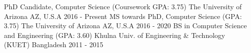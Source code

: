 

\begin{cventries}

  \cventry
    {PhD Candidate, Computer Science (Coursework GPA: 3.75)} %
    {The University of Arizona} %
    {AZ, U.S.A} %
    {2016 - Present} %
    {}
    {}
  \vspace*{-2mm}
  \cventry
    {MS towards PhD, Computer Science (GPA: 3.75)} %
    {The University of Arizona} %
    {AZ, U.S.A} %
    {2016 - 2020} %
    {}
    {}
  \vspace*{-2mm}
  \cventry
    {BS in Computer Science and Engineering (GPA: 3.60)} %
    {Khulna Univ. of Engineering \& Technology (KUET)} %
    {Bangladesh} %
    {2011 - 2015} %
    {}
    {}

\end{cventries}
